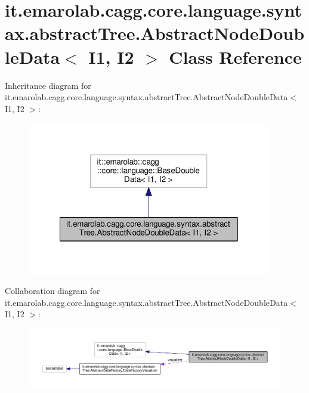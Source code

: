 \hypertarget{classit_1_1emarolab_1_1cagg_1_1core_1_1language_1_1syntax_1_1abstractTree_1_1AbstractNodeDoubleData_3_01I1_00_01I2_01_4}{\section{it.\-emarolab.\-cagg.\-core.\-language.\-syntax.\-abstract\-Tree.\-Abstract\-Node\-Double\-Data$<$ I1, I2 $>$ Class Reference}
\label{classit_1_1emarolab_1_1cagg_1_1core_1_1language_1_1syntax_1_1abstractTree_1_1AbstractNodeDoubleData_3_01I1_00_01I2_01_4}
}


Inheritance diagram for it.\-emarolab.\-cagg.\-core.\-language.\-syntax.\-abstract\-Tree.\-Abstract\-Node\-Double\-Data$<$ I1, I2 $>$\-:\nopagebreak
\begin{figure}[H]
\begin{center}
\leavevmode
\includegraphics[width=302pt]{classit_1_1emarolab_1_1cagg_1_1core_1_1language_1_1syntax_1_1abstractTree_1_1AbstractNodeDoubleD653de1c03caee3bad9f8daf4ea69c3f6}
\end{center}
\end{figure}


Collaboration diagram for it.\-emarolab.\-cagg.\-core.\-language.\-syntax.\-abstract\-Tree.\-Abstract\-Node\-Double\-Data$<$ I1, I2 $>$\-:\nopagebreak
\begin{figure}[H]
\begin{center}
\leavevmode
\includegraphics[width=350pt]{classit_1_1emarolab_1_1cagg_1_1core_1_1language_1_1syntax_1_1abstractTree_1_1AbstractNodeDoubleDff5ec2812e3d7ddb951763cb157d8e85}
\end{center}
\end{figure}
